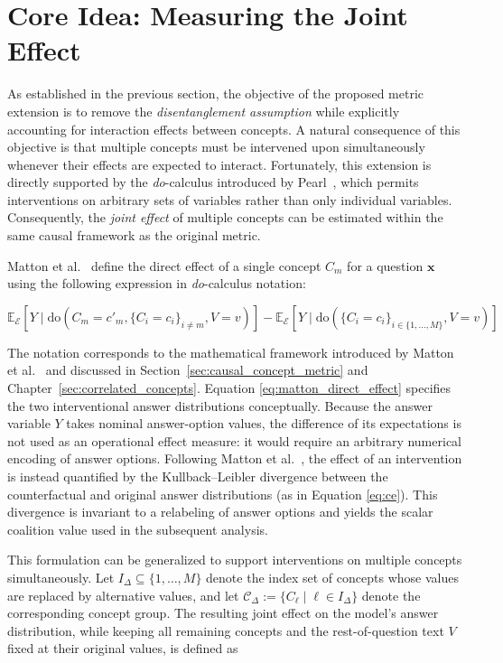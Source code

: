 \section{Core Idea: Measuring the Joint Effect}
\label{sec:joint_effect}

As established in the previous section, the objective of the proposed metric extension is to remove the \emph{disentanglement assumption} while explicitly accounting for interaction effects between concepts. A natural consequence of this objective is that multiple concepts must be intervened upon simultaneously whenever their effects are expected to interact. Fortunately, this extension is directly supported by the \emph{do}-calculus introduced by Pearl~\cite{pearlCausalDiagramsEmpirical1995}, which permits interventions on arbitrary sets of variables rather than only individual variables. Consequently, the \emph{joint effect} of multiple concepts can be estimated within the same causal framework as the original metric.

Matton et al.~\cite{mattonWalkTalkMeasuring2024} define the direct effect of a single concept $C_m$ for a question $\mathbf{x}$ using the following expression in \emph{do}-calculus notation:

\begin{equation}
	\label{eq:matton_direct_effect}
	\mathbb{E}_{\mathcal{E}}[Y \mid \text{do}(C_m = c'_m, \{C_i = c_i\}_{i \neq m}, V = v)] -
	\mathbb{E}_{\mathcal{E}}[Y \mid \text{do}(\{C_i = c_i\}_{i \in \{1,\dots,M\}}, V = v)]
\end{equation}

The notation corresponds to the mathematical framework introduced by Matton et al.~\cite{mattonWalkTalkMeasuring2024} and discussed in Section~\ref{sec:causal_concept_metric} and Chapter~\ref{sec:correlated_concepts}. Equation \ref{eq:matton_direct_effect} specifies the two interventional answer distributions conceptually. Because the answer variable $Y$ takes nominal answer-option values, the difference of its expectations is not used as an operational effect measure: it would require an arbitrary numerical encoding of answer options. Following Matton et al.~\cite{mattonWalkTalkMeasuring2024}, the effect of an intervention is instead quantified by the Kullback–Leibler divergence between the counterfactual and original answer distributions (as in Equation \ref{eq:ce}). This divergence is invariant to a relabeling of answer options and yields the scalar coalition value used in the subsequent analysis.

This formulation can be generalized to support interventions on multiple concepts simultaneously. Let $I_{\Delta} \subseteq \{1,\dots,M\}$ denote the index set of concepts whose values are replaced by alternative values, and let $\mathcal{C}_{\Delta}:=\{C_\ell \mid \ell \in I_{\Delta}\}$ denote the corresponding concept group. The resulting joint effect on the model's answer distribution, while keeping all remaining concepts and the rest-of-question text $V$ fixed at their original values, is defined as

